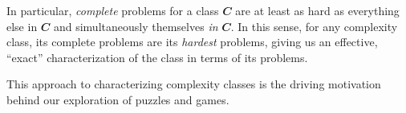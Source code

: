 In particular, \emph{complete} problems for a class \(\mathbfit C\) are at
least as hard as everything else in \(\mathbfit C\) and simultaneously
themselves \emph{in} \(\mathbfit C\).  In this sense, for any complexity class,
its complete problems are its \emph{hardest} problems, giving us an effective,
``exact'' characterization of the class in terms of its problems.

This approach to characterizing complexity classes is the driving motivation
behind our exploration of puzzles and games.

%
%
%
%
%
%
%

